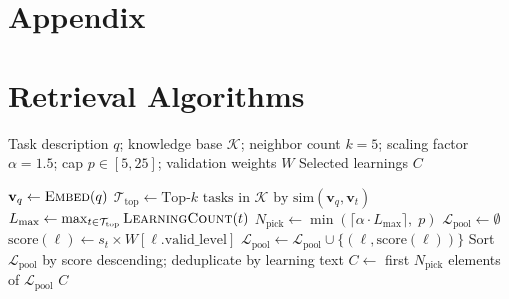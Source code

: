 \appendix

\section*{Appendix}

\section{Retrieval Algorithms}
\label{app:algorithms}

\begin{algorithm}[h]
\caption{Context Retrieval from Knowledge Base}
\label{alg:context-retrieval}
\begin{algorithmic}[1]
\REQUIRE Task description $q$; knowledge base $\mathcal{K}$; neighbor count $k{=}5$; scaling factor $\alpha{=}1.5$; cap $p \in [5, 25]$; validation weights $W$
\ENSURE Selected learnings $C$

\STATE $\mathbf{v}_q \leftarrow \textsc{Embed}(q)$
\STATE $\mathcal{T}_{\text{top}} \leftarrow \text{Top-}k \text{ tasks in } \mathcal{K} \text{ by } \text{sim}(\mathbf{v}_q, \mathbf{v}_t)$ 
\STATE $L_{\max} \leftarrow \max_{t \in \mathcal{T}_{\text{top}}} \textsc{LearningCount}(t)$
\STATE $N_{\text{pick}} \leftarrow \min(\lceil \alpha \cdot L_{\max} \rceil, \; p)$
\STATE $\mathcal{L}_{\text{pool}} \leftarrow \emptyset$
        \STATE $\text{score}(\ell) \leftarrow s_t \times W[\ell.\text{valid\_level}]$
        \STATE $\mathcal{L}_{\text{pool}} \leftarrow \mathcal{L}_{\text{pool}} \cup \{(\ell, \text{score}(\ell))\}$
    \ENDFOR
\ENDFOR
\STATE Sort $\mathcal{L}_{\text{pool}}$ by score descending; deduplicate by learning text
\STATE $C \leftarrow$ first $N_{\text{pick}}$ elements of $\mathcal{L}_{\text{pool}}$
\RETURN $C$
\end{algorithmic}
\end{algorithm}

